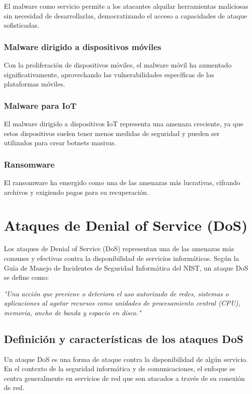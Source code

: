 El malware como servicio permite a los atacantes alquilar herramientas maliciosas sin necesidad de desarrollarlas, democratizando el acceso a capacidades de ataque sofisticadas.

\subsubsection{Malware dirigido a dispositivos móviles}

Con la proliferación de dispositivos móviles, el malware móvil ha aumentado significativamente, aprovechando las vulnerabilidades específicas de las plataformas móviles.

\subsubsection{Malware para IoT}

El malware dirigido a dispositivos IoT representa una amenaza creciente, ya que estos dispositivos suelen tener menos medidas de seguridad y pueden ser utilizados para crear botnets masivas.

\subsubsection{Ransomware}

El ransomware ha emergido como una de las amenazas más lucrativas, cifrando archivos y exigiendo pagos para su recuperación.

\section{Ataques de Denial of Service (DoS)}

Los ataques de Denial of Service (DoS) representan una de las amenazas más comunes y efectivas contra la disponibilidad de servicios informáticos. Según la Guía de Manejo de Incidentes de Seguridad Informática del NIST, un ataque DoS se define como:

\textit{"Una acción que previene o deteriora el uso autorizado de redes, sistemas o aplicaciones al agotar recursos como unidades de procesamiento central (CPU), memoria, ancho de banda y espacio en disco."}

\subsection{Definición y características de los ataques DoS}

Un ataque DoS es una forma de ataque contra la disponibilidad de algún servicio. En el contexto de la seguridad informática y de comunicaciones, el enfoque se centra generalmente en servicios de red que son atacados a través de su conexión de red.


